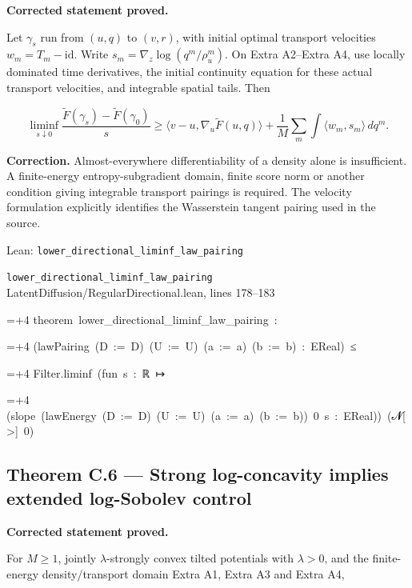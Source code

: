 \documentclass[11pt,a4paper]{report}
\newlength{\leancharwidth}
\newenvironment{leancode}{\par\smallskip\begingroup\ttfamily\footnotesize\raggedright
  \settowidth{\leancharwidth}{M}\setlength{\parskip}{0pt}\setlength{\parindent}{0pt}
  \frenchspacing}{\par\endgroup\smallskip}
\newcommand{\leanline}[2]{\hangindent=\dimexpr#1\leancharwidth+4\leancharwidth\relax
  \hangafter=1\noindent\hspace*{#1\leancharwidth}#2\par}
\newcommand{\leansource}[1]{\par{\footnotesize\color{leanmuted}#1}\par}
\begin{document}
\textbf{Corrected statement proved.}



Let \(\gamma_s\) run from \((u,q)\) to
        \((v,r)\), with initial optimal transport velocities
        \(w_m=T_m-\mathrm{id}\). Write
        \(s_m=\nabla_z\log(q^m/\rho_u^m)\). On Extra A2–Extra A4, use locally dominated
        time derivatives, the initial continuity equation for these actual
        transport velocities, and integrable spatial tails. Then


        \[\liminf_{s\downarrow0}
          \frac{\widetilde F(\gamma_s)-\widetilde F(\gamma_0)}s
          \ge\langle v-u,\nabla_u\widetilde F(u,q)\rangle
          +\frac1M\sum_m\int\langle w_m,s_m\rangle\,dq^m.\]

\textbf{Correction.} Almost-everywhere differentiability of a density alone is insufficient. A finite-energy entropy-subgradient domain, finite score norm or another condition giving integrable transport pairings is required. The velocity formulation explicitly identifies the Wasserstein tangent pairing used in the source.

\begin{leanbox}{Lean: \texttt{lower\_\allowbreak{}directional\_\allowbreak{}liminf\_\allowbreak{}law\_\allowbreak{}pairing}}
\leansource{\texttt{lower\_\allowbreak{}directional\_\allowbreak{}liminf\_\allowbreak{}law\_\allowbreak{}pairing} \quad LatentDiffusion/\allowbreak{}RegularDirectional.lean, lines 178–183}
\begin{leancode}
\leanline{0}{theorem\ lower\_directional\_liminf\_law\_pairing\ :}
\leanline{4}{(lawPairing\ (D\ :=\ D)\ (U\ :=\ U)\ (a\ :=\ a)\ (b\ :=\ b)\ :\ EReal)\ ≤}
\leanline{6}{Filter.liminf\ (fun\ s\ :\ ℝ\ ↦}
\leanline{8}{(slope\ (lawEnergy\ (D\ :=\ D)\ (U\ :=\ U)\ (a\ :=\ a)\ (b\ :=\ b))\ 0\ s\ :\ EReal))\ ({\leanfallback 𝓝}[>]\ 0)}
\end{leancode}
\end{leanbox}
\subsection{\texorpdfstring{Theorem C.6 — Strong log-concavity implies extended log-Sobolev control}{Theorem C.6 — Strong log-concavity implies extended log-Sobolev control}}


\textbf{Corrected statement proved.}



For \(M\ge1\), jointly \(\lambda\)-strongly convex tilted potentials with \(\lambda>0\), and the finite-energy density/\allowbreak{}transport domain Extra A1, Extra A3 and Extra A4,
\end{document}
